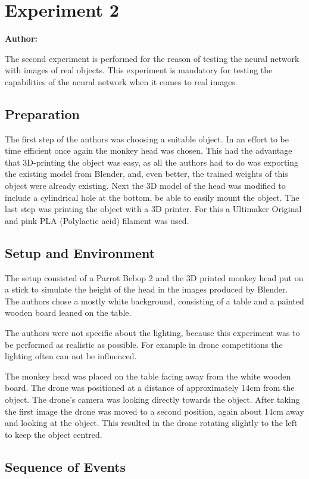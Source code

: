 \chapter{Experiment 2}

\textbf{Author: } 

The second experiment is performed for the reason of testing the neural network with images of real objects. This experiment is mandatory for testing the capabilities of the neural network when it comes to real images.

\section{Preparation}
The first step of the authors was choosing a suitable object. In an effort to be time efficient once again the monkey head was chosen. This had the advantage that 3D-printing the object was easy, as all the authors had to do was exporting the existing model from Blender, and, even better, the trained weights of this object were already existing. Next the 3D model of the head was modified to include a cylindrical hole at the bottom, be able to easily mount the object. The last step was printing the object with a 3D printer. For this a Ultimaker Original and pink PLA (Polylactic acid) filament was used.

\section{Setup and Environment}
The setup consisted of a Parrot Bebop 2 and the 3D printed monkey head put on a stick to simulate the height of the head in the images produced by Blender. The authors chose a mostly white background, consisting of a table and a painted wooden board leaned on the table.

The authors were not specific about the lighting, because this experiment was to be performed as realistic as possible. For example in drone competitions the lighting often can not be influenced.

The monkey head was placed on the table facing away from the white wooden board. The drone was positioned at a distance of approximately 14cm from the object. The drone's camera was looking directly towards the object. After taking the first image the drone was moved to a second position, again about 14cm away and looking at the object. This resulted in the drone rotating slightly to the left to keep the object centred.

\section{Sequence of Events}

